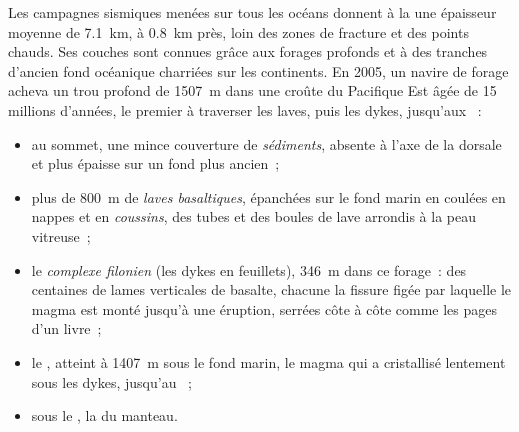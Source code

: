Les campagnes sismiques menées sur tous les océans donnent à la  une épaisseur moyenne de \qty{7.1}{km}, à \qty{0.8}{km} près, loin
des zones de fracture et des points chauds. Ses couches sont connues grâce
aux forages profonds et à des tranches d'ancien fond océanique charriées sur
les continents. En 2005, un navire de forage acheva un trou profond de
\qty{1507}{m} dans une croûte du Pacifique Est âgée de 15 millions d'années,
le premier à traverser les laves, puis les dykes, jusqu'aux ~:

\begin{itemize}
  \item au sommet, une mince couverture de \emph{sédiments}, absente à l'axe
        de la dorsale et plus épaisse sur un fond plus ancien~;
  \item plus de \qty{800}{m} de \emph{laves basaltiques}, épanchées sur le
        fond marin en coulées en nappes et en \emph{coussins}, des tubes et
        des boules de lave arrondis à la peau vitreuse~;
  \item le \emph{complexe filonien} (les dykes en feuillets), \qty{346}{m}
        dans ce forage~: des centaines de lames verticales de basalte,
        chacune la fissure figée par laquelle le magma est monté jusqu'à
        une éruption, serrées côte à côte comme les pages d'un livre~;
  \item le \emph{}, atteint à \qty{1407}{m} sous le fond marin, le
        magma qui a cristallisé lentement sous les dykes, jusqu'au ~;
  \item sous le , la \emph{} du manteau.
\end{itemize}

